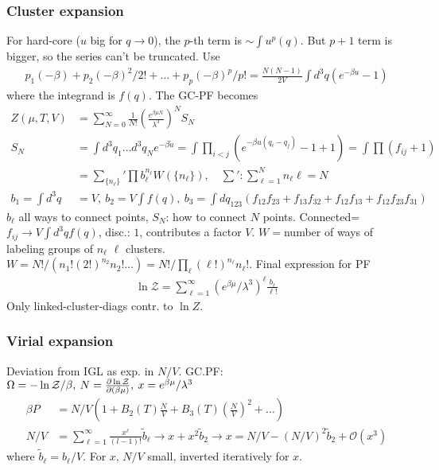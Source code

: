 \documentclass[a4paper, english, 12pt]{article}
\newcommand{\closed}[1]{\left( #1 \right)}
\newcommand{\curly}[1]{\{ #1 \} }
\begin{document}
\begin{multicols*}{2}
\subsubsection*{\scriptsize Cluster expansion}
For hard-core ($u$ big for $q\to0$), the $p$-th term is $\sim \int u^p(q)$. But $p+1$ term is bigger, so the series can't be truncated. Use 
\begin{align*}
    p_1 (-\beta)  + p_2 (-\beta)^2 /2! + \dots + p_p (-\beta)^p /p! = \frac{N(N-1)}{2V} \int d^3 q (e^{-\beta u}-1)
\end{align*}
where the integrand is $f(q)$. The GC-PF becomes 
\begin{align*}
    Z(\mu,T,V) &= \sum_{N=0}^\infty \frac{1}{N!} \closed{\frac{e^{\beta\mu N}}{\lambda^3}}^N S_N \\ 
    S_N &=\int d^3 q_1 \dots d^3 q_N e^{-\beta \tilde{u}} = \int \prod_{i<j}\closed{e^{-\beta u(q_i-q_j)}-1+1} = \int \prod (f_{ij}+1) \\
    &= \sum_{\curly{n_\ell}}' \prod b_\ell^{n_\ell} W(\curly{n_\ell}),\quad \sum': \sum_{\ell=1}^N n_\ell \ell =N \\
    b_1 = \int d^3 q &=V,\: b_2 = V \int f(q),\: b_3 = \int d q_{123}(f_{12}f_{23}+f_{13}f_{32}+f_{12}f_{13}+f_{12}f_{23}f_{31})
\end{align*}
$b_\ell$ all ways to connect points, $S_N$: how to connect $N$ points. Connected=$f_{ij}\to V\int d^3 q f(q)$, disc.: $1$, contributes a factor $V$. $W=$number of ways of labeling groups of $n_\ell$ $\ell$ clusters. $W=N!/(n_1 ! (2!)^{n_2} n_2 ! ...)=N!/\prod_\ell (\ell!)^{n_\ell} n_\ell!$.
Final expression for PF 
\begin{align*}
    \ln \mathcal{Z} = \sum_{\ell=1}^\infty (e^{\beta\mu}/\lambda^3)^\ell  \frac{b_\ell}{\ell!}
\end{align*}
Only linked-cluster-diags contr. to $\ln Z$.  


\subsubsection*{\scriptsize Virial expansion}
Deviation from IGL as exp. in $N/V$. GC.PF: $\Omega=-\ln \mathcal{Z}/\beta,\:N=\pdv{\ln\mathcal{Z}}{(\beta\mu)},\:x=e^{\beta\mu}/\lambda^3 $
\begin{align*}
    \beta P &= N/V \closed{1 + B_2(T)\frac{N}{V} + B_3(T) \closed{\frac{N}{V}}^2 + \dots} \\ 
    N/V &= \sum_{\ell=1}^\infty \frac{x^\ell}{(l-1)!} \tilde{b}_\ell \to x + x^2 \tilde{b}_2 \to x=N/V-(N/V)^2 \tilde{b}_2 + \mathcal{O}(x^3) 
\end{align*}
where $\tilde{b}_\ell=b_\ell/V$. For $x,\,N/V$ small, inverted iteratively for $x$. 




\end{multicols*}
\end{document}

